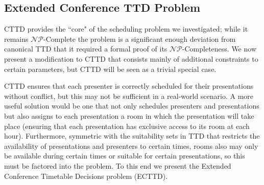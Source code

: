 \documentclass[]{article}
\theoremstyle{definition}
\theoremstyle{remark}
\numberwithin{equation}{section}
\newcommand{\cNP}{$\mathcal{NP}$}
\begin{document}
\subsection{Extended Conference TTD Problem}
CTTD provides the ``core" of the scheduling problem we investigated; while it remains \cNP-Complete the problem is a significant enough deviation from canonical TTD that it required a formal proof of its \cNP-Completeness. We now present a modification to CTTD that consists mainly of additional constraints to certain parameters, but CTTD will be seen as a trivial special case.

CTTD ensures that each presenter is correctly scheduled for their presentations without conflict, but this may not be sufficient in a real-world scenario. A more useful solution would be one that not only schedules presenters and presentations but also assigns to each presentation a room in which the presentation will take place (ensuring that each presentation has exclusive access to its room at each hour). Furthermore, symmetric with the suitability sets in TTD that restricts the availability of presentations and presenters to certain times, rooms also may only be available during certain times or suitable for certain presentations, so this must be factored into the problem. To this end we present the Extended Conference Timetable Decisions problem (ECTTD).
\end{document}
